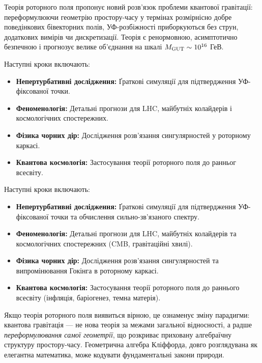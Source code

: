 \documentclass[11pt,a4paper]{article}
\numberwithin{equation}{section}
\theoremstyle{plain}
\theoremstyle{definition}
\theoremstyle{remark}
\begin{document}
Теорія роторного поля пропонує новий розв'язок проблеми квантової гравітації: переформулюючи геометрію простору-часу у термінах розмірнісно добре поведінкових бівекторних полів, УФ-розбіжності приборкуються без струн, додаткових вимірів чи дискретизації. Теорія є ренормовною, асимптотично безпечною і прогнозує велике об'єднання на шкалі $M_{\rm GUT}\sim 10^{16}$ ГеВ.

Наступні кроки включають:
\begin{itemize}
  \item \textbf{Непертурбативні дослідження:} Ґраткові симуляції для підтвердження УФ-фіксованої точки.
  \item \textbf{Феноменологія:} Детальні прогнози для LHC, майбутніх колайдерів і космологічних спостережних.
  \item \textbf{Фізика чорних дір:} Дослідження розв'язання сингулярностей у роторному каркасі.
  \item \textbf{Квантова космологія:} Застосування теорії роторного поля до ранньог всесвіту.
\end{itemize}

Наступні кроки включають:
\begin{itemize}
  \item \textbf{Непертурбативні дослідження:} Ґраткові симуляції для підтвердження УФ-фіксованої точки та обчислення сильно-зв'язаного спектру.
  \item \textbf{Феноменологія:} Детальні прогнози для LHC, майбутніх колайдерів та космологічних спостережних (CMB, гравітаційні хвилі).
  \item \textbf{Фізика чорних дір:} Дослідження розв'язання сингулярностей та випромінювання Гокінга в роторному каркасі.
  \item \textbf{Квантова космологія:} Застосування теорії роторного поля до раннього всесвіту (інфляція, баріогенез, темна матерія).
\end{itemize}

Якщо теорія роторного поля виявиться вірною, це ознаменує зміну парадигми: квантова гравітація — не нова теорія за межами загальної відносності, а радше \emph{переформулювання самої геометрії}, що розкриває приховану алгебраїчну структуру простору-часу. Геометрична алгебра Кліффорда, довго розглядувана як елегантна математика, може кодувати фундаментальні закони природи.

\vspace{1em}

\end{document}
